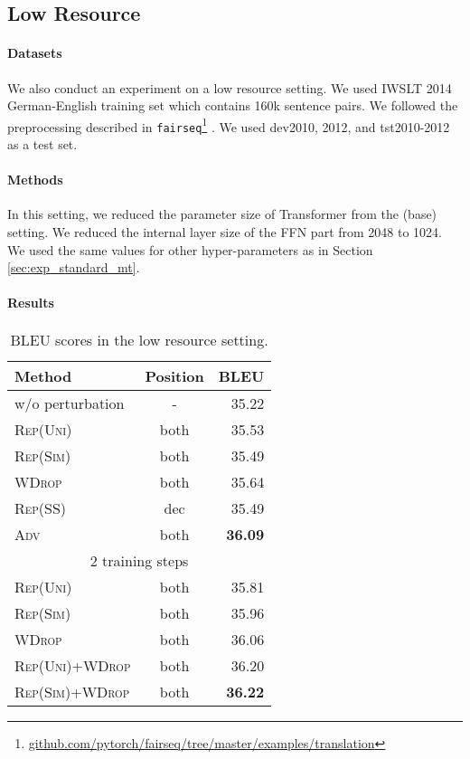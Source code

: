 \documentclass[11pt]{article}
\newcommand{\uniform}{\textsc{Rep(Uni)}}
\newcommand{\parass}{\textsc{Rep(SS)}}
\newcommand{\similarity}{\textsc{Rep(Sim)}}
\newcommand{\worddrop}{\textsc{WDrop}}
\newcommand{\adv}{\textsc{Adv}}
\begin{document}
\subsection{Low Resource}


\paragraph{Datasets}
We also conduct an experiment on a low resource setting.
We used IWSLT 2014 German-English training set which contains 160k sentence pairs.
We followed the preprocessing described in \texttt{fairseq}\footnote{\href{https://github.com/pytorch/fairseq/tree/master/examples/translation}{github.com/pytorch/fairseq/tree/master/examples/translation}} \cite{ott-etal-2019-fairseq}.
We used dev2010, 2012, and tst2010-2012 as a test set.

\paragraph{Methods}
In this setting, we reduced the parameter size of Transformer from the (base) setting.
We reduced the internal layer size of the FFN part from 2048 to 1024.
We used the same values for other hyper-parameters as in Section \ref{sec:exp_standard_mt}.



\paragraph{Results}
\label{sec:ex_mt_low_resource}
\begin{table}[!t]
  \centering
  \footnotesize
  \begin{tabular}{ l | c | r } \hline
  Method & Position & BLEU \\ \hline 
  w/o perturbation & - & 35.22 \\ \hline
  \uniform{} & both & 35.53\\
  \similarity{} & both & 35.49 \\
  \worddrop{} & both & 35.64 \\
  \parass{} & dec & 35.49 \\
  \adv{} & both & \textbf{36.09} \\ \hline
  \multicolumn{3}{c}{2 training steps} \\ \hline
  \uniform{} & both & 35.81 \\
  \similarity{} & both & 35.96 \\
  \worddrop{} & both & 36.06 \\
  \uniform{}+\worddrop{} & both & 36.20 \\
  \similarity{}+\worddrop{} & both & \textbf{36.22}\\ \hline
  \end{tabular}
  \caption{BLEU scores in the low resource setting.\label{tab:exp_mt_on_low_resource}}
\end{table}
\end{document}
